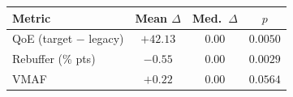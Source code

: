 \begin{tabularx}{\linewidth}{@{}>{\raggedright\arraybackslash}Xccc@{}}
\toprule
\textbf{Metric} & \textbf{Mean $\Delta$} & \textbf{Med.\ $\Delta$} & \textbf{$p$} \\
\midrule
QoE (target $-$ legacy) & $+42.13$ & $0.00$ & $0.0050$ \\
Rebuffer (\% pts)         & $-0.55$  & $0.00$ & $0.0029$ \\
VMAF                      & $+0.22$  & $0.00$ & $0.0564$ \\
\bottomrule
\end{tabularx}
